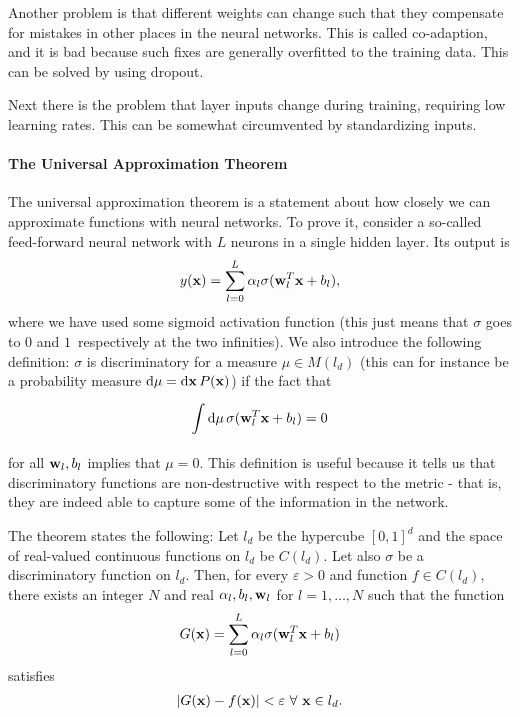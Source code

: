 Another problem is that different weights can change such that they compensate for mistakes in other places in the neural networks. This is called co-adaption, and it is bad because such fixes are generally overfitted to the training data. This can be solved by using dropout.

Next there is the problem that layer inputs change during training, requiring low learning rates. This can be somewhat circumvented by standardizing inputs.

\paragraph{The Universal Approximation Theorem}
The universal approximation theorem is a statement about how closely we can approximate functions with neural networks. To prove it, consider a so-called feed-forward neural network with $L$ neurons in a single hidden layer. Its output is
\begin{align*}
	y(\vb{x}) = \sum\limits_{l = 0}^{L}\alpha_{l}\sigma(\vb{w}_{l}^{T}\vb{x} + b_{l}),
\end{align*}
where we have used some sigmoid activation function (this just means that $\sigma$ goes to $0$ and $1$ respectively at the two infinities). We also introduce the following definition: $\sigma$ is discriminatory for a measure $\mu\in M(l_{d})$ (this can for instance be a probability measure $\dd{\mu} = \dd{\vb{x}}P(\vb{x})$) if the fact that
\begin{align*}
	\int\limits_{}^{}\dd{\mu}\sigma(\vb{w}_{l}^{T}\vb{x} + b_{l}) = 0
\end{align*}
for all $\vb{w}_{l}, b_{l}$ implies that $\mu = 0$. This definition is useful because it tells us that discriminatory functions are non-destructive with respect to the metric - that is, they are indeed able to capture some of the information in the network.

The theorem states the following: Let $l_{d}$ be the hypercube $[0, 1]^{d}$ and the space of real-valued continuous functions on $l_{d}$ be $C(l_{d})$. Let also $\sigma$ be a discriminatory function on $l_{d}$. Then, for every $\varepsilon > 0$ and function $f\in C(l_{d})$, there exists an integer $N$ and real $\alpha_{l}, b_{l}, \vb{w}_{l}$ for $l = 1, \dots, N$ such that the function
\begin{align*}
	G(\vb{x}) = \sum\limits_{l = 0}^{L}\alpha_{l}\sigma(\vb{w}_{l}^{T}\vb{x} + b_{l})
\end{align*}
satisfies
\begin{align*}
	\abs{G(\vb{x}) - f(\vb{x})} < \varepsilon\ \forall\ \vb{x}\in l_{d}.
\end{align*}

